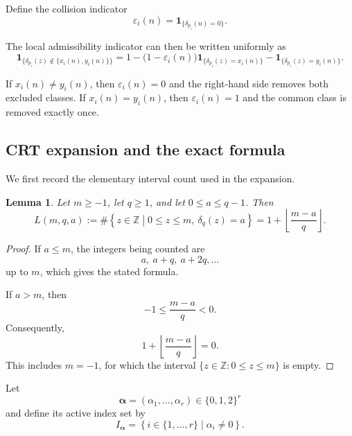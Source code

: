 \documentclass[12pt]{article}
\numberwithin{equation}{section}
\newtheorem{lemma}[theorem]{Lemma}
\theoremstyle{definition}
\theoremstyle{remark}
\newcommand{\Z}{\mathbb Z}
\newcommand{\one}[1]{\mathbf 1_{\{#1\}}}
\begin{document}
Define the collision indicator
\begin{equation}
\label{eq:epsilon-definition}
\varepsilon_i(n)
=
\one{\delta_{p_i}(n)=0}.
\end{equation}

The local admissibility indicator can then be written uniformly
as
\begin{equation}
\label{eq:local-indicator}
\one{
\delta_{p_i}(z)\notin\{x_i(n),y_i(n)\}
}
=
1
-
\bigl(1-\varepsilon_i(n)\bigr)
\one{\delta_{p_i}(z)=x_i(n)}
-
\one{\delta_{p_i}(z)=y_i(n)}.
\end{equation}

If $x_i(n)\neq y_i(n)$, then $\varepsilon_i(n)=0$ and the
right-hand side removes both excluded classes. If
$x_i(n)=y_i(n)$, then $\varepsilon_i(n)=1$ and the common class
is removed exactly once.

\subsection{CRT expansion and the exact formula}

We first record the elementary interval count used in the
expansion.

\begin{lemma}
\label{lem:L-count}
Let $m\geq-1$, let $q\geq1$, and let
$0\leq a\leq q-1$. Then
\begin{equation}
\label{eq:L-definition}
L(m,q,a)
:=
\#\left\{
z\in\Z
\mathrel{}\middle|\mathrel{}
0\leq z\leq m,\ 
\delta_q(z)=a
\right\}
=
1+\left\lfloor\frac{m-a}{q}\right\rfloor.
\end{equation}
\end{lemma}

\begin{proof}
If $a\leq m$, the integers being counted are
\[
a,\ a+q,\ a+2q,\dots
\]
up to $m$, which gives the stated formula.

If $a>m$, then
\[
-1\leq\frac{m-a}{q}<0.
\]
Consequently,
\[
1+\left\lfloor\frac{m-a}{q}\right\rfloor=0.
\]
This includes $m=-1$, for which the interval
$\{z\in\Z:0\leq z\leq m\}$ is empty.
\end{proof}

Let
\[
\boldsymbol\alpha
=
(\alpha_1,\dots,\alpha_r)
\in\{0,1,2\}^{r}
\]
and define its active index set by
\begin{equation}
\label{eq:active-indices}
I_{\boldsymbol\alpha}
=
\left\{
i\in\{1,\dots,r\}
\mathrel{}\middle|\mathrel{}
\alpha_i\neq0
\right\}.
\end{equation}
\end{document}
